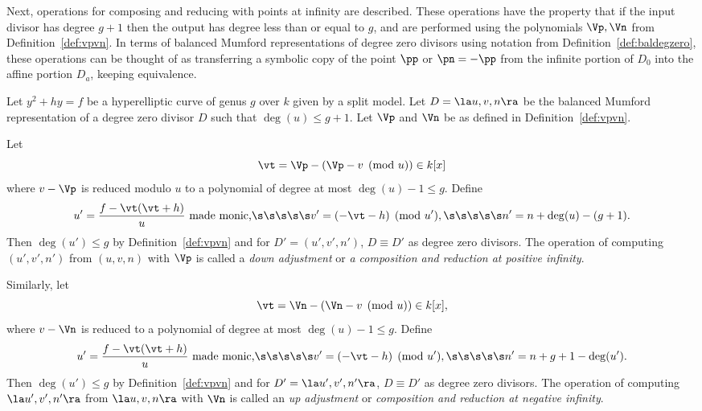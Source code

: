 Next, operations for composing and reducing with points at infinity are
described. These operations have the property that if the input divisor has
degree $g+1$ then the output has degree less than or equal to $g$, and are
performed using the polynomials $\Vp,\Vn$ from Definition~\ref{def:vpvn}. In
terms of balanced Mumford representations of degree zero divisors using notation
from Definition~\ref{def:baldegzero}, these operations can be thought of as
transferring a symbolic copy of the point $\pp$ or $\pn = -\pp$ from the
infinite portion of $D_0$ into the affine portion $D_a$, keeping equivalence. 


\bl\label{lem:adj} \cite[Adapted from Lemma~10.4.6]{Galbraith_PKC_2012}
Let $y^2 + hy = f$ be a hyperelliptic curve of genus $g$ over $k$ given by a split
model. Let $D = \la u,v,n \ra$ be the balanced Mumford representation of a
degree zero divisor $D$ such that $\deg(u) \leq g + 1$. Let $\Vp$ and $\Vn$ be
as defined in Definition~\ref{def:vpvn}. 

Let $$ \vt = \Vp - (\Vp - v \pmod{u}) \in k[x]$$  where  $v - \Vp$ is reduced
modulo $u$ to a polynomial of degree at most $\deg(u) - 1 \leq g$. Define $$ u'
= \frac{f - \vt(\vt + h)}{u} \mbox{ made monic,} \s\s\s\s\s v' = (-\vt -
h) \pmod{u'}, \s\s\s\s\s n' = n + \deg(u)-(g+1).$$ Then $\deg(u') \leq g$ by
Definition~\ref{def:vpvn} and for $D' = (u',v',n')$, $D \equiv D'$ as degree
zero divisors. The operation of computing $(u',v',n')$ from $(u,v,n)$ with $\Vp$
is called a \emph{down adjustment} or \emph{a composition and reduction at
positive infinity}.

Similarly, let $$ \vt = \Vn - (\Vn - v \pmod{u}) \in k[x],$$ where  $v - \Vn$ is
reduced to a polynomial of degree at most $\deg(u) - 1 \leq g$. Define $$ u' =
\frac{f - \vt(\vt + h)}{u} \mbox{ made monic,} \s\s\s\s\s v' = (-\vt -
h) \pmod{u'}, \s\s\s\s\s n' = n + g + 1 - \deg(u').$$ Then $\deg(u') \leq g$ by
Definition~\ref{def:vpvn} and for $D' = \la u',v',n' \ra$, $D \equiv D'$ as degree
zero divisors. The operation of computing $\la u',v',n' \ra$ from $\la u,v,n \ra$ with $\Vn$
is called an \emph{up adjustment} or \emph{composition and reduction at negative
infinity}.
\el

